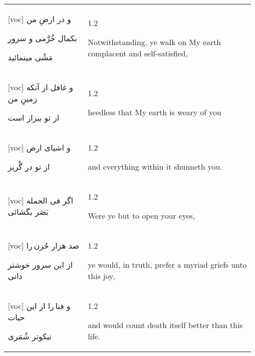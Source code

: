 \documentclass[11pt]{article}
\makeatletter
\newenvironment{orig}
  {\begin{farsi}[voc]}
  {\end{farsi}}
\newenvironment{trans}
  {\Large\begin{spacing}{1.2}\raggedright}
  {\end{spacing}}
\newenvironment{word}
  {\begin{tabular}[t]{p{2.75in}@{\hspace{3em}}p{2.75in}}}
  {\end{tabular}}
\newcommand{\ayat}[2]{\begin{orig}#1\end{orig} & \begin{trans}#2\end{trans}}
\newcommand{\heading}[2]{\textsc{\textbf{#1}} %
}
\makeatother
\begin{document}
\pagebreak

\begin{word}
\ayat{
و در ارضِ من

بکمال خُرَّمی و سرور

مَشْی مينمائيد
}{Notwithstanding, ye walk on My earth complacent and self-satisfied,} \\ \ayat{
و غافل از آنکه زمينِ من

از تو بيزار است
}{heedless that My earth is weary of you} \\ \ayat{
و اشيای ارض

از تو در گُريز
}{and everything within it shunneth you.} \\ \ayat{
اگر فی الجمله بَصَر بگشائی
}{Were ye but to open your eyes,} \vspace{-1ex}\\ \ayat{
صد هزار حُزن را

از اين سرور خوشتر دانی
}{ye would, in truth, prefer a myriad griefs unto this joy,} \\ \ayat{
و فنا را از اين حيات

نيکوتر شُمَری
}{and would count death itself better than this life.}
\end{word}




\end{document}
